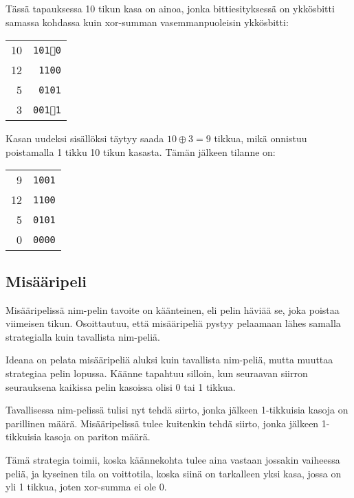 Tässä tapauksessa
10 tikun kasa on ainoa,
jonka bittiesityksessä on ykkösbitti
samassa kohdassa kuin 
xor-summan vasemmanpuoleisin ykkösbitti:

\begin{center}
\begin{tabular}{r|r}
10 & \texttt{10\textcircled{1}0} \\
12 & \texttt{1100} \\
5 & \texttt{0101} \\
\hline
3 & \texttt{00\textcircled{1}1} \\
\end{tabular}
\end{center}

Kasan uudeksi sisällöksi täytyy saada
$10 \oplus 3 = 9$ tikkua,
mikä onnistuu poistamalla 1 tikku
10 tikun kasasta.
Tämän jälkeen tilanne on:

\begin{center}
\begin{tabular}{r|r}
9 & \texttt{1001} \\
12 & \texttt{1100} \\
5 & \texttt{0101} \\
\hline
0 & \texttt{0000} \\
\end{tabular}
\end{center}

\subsection{Misääripeli}

Misääripelissä nim-pelin tavoite on käänteinen,
eli pelin häviää se, joka poistaa viimeisen tikun.
Osoittautuu, että misääripeliä pystyy pelaamaan lähes samalla
strategialla kuin tavallista nim-peliä.

Ideana on pelata misääripeliä aluksi kuin tavallista
nim-peliä, mutta muuttaa strategiaa pelin
lopussa. Käänne tapahtuu silloin, kun seuraavan
siirron seurauksena kaikissa pelin kasoissa olisi 0 tai 1 tikkua.

Tavallisessa nim-pelissä tulisi nyt tehdä siirto,
jonka jälkeen 1-tikkuisia kasoja on parillinen määrä.
Misääripelissä tulee kuitenkin tehdä siirto,
jonka jälkeen 1-tikkuisia kasoja on pariton määrä.

Tämä strategia toimii, koska käännekohta tulee aina
vastaan jossakin vaiheessa peliä,
ja kyseinen tila on voittotila,
koska siinä on tarkalleen yksi kasa,
jossa on yli 1 tikkua,
joten xor-summa ei ole 0.

